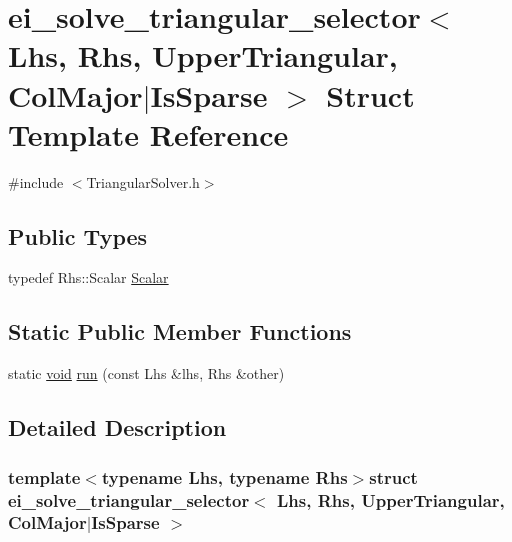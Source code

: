\hypertarget{structei__solve__triangular__selector_3_01_lhs_00_01_rhs_00_01_upper_triangular_00_01_col_major_7_is_sparse_01_4}{\section{ei\-\_\-solve\-\_\-triangular\-\_\-selector$<$ Lhs, Rhs, Upper\-Triangular, Col\-Major$|$\-Is\-Sparse $>$ Struct Template Reference}
\label{structei__solve__triangular__selector_3_01_lhs_00_01_rhs_00_01_upper_triangular_00_01_col_major_7_is_sparse_01_4}
}


{\ttfamily \#include $<$Triangular\-Solver.\-h$>$}

\subsection*{Public Types}
\begin{DoxyCompactItemize}
\item 
typedef Rhs\-::\-Scalar \hyperlink{structei__solve__triangular__selector_3_01_lhs_00_01_rhs_00_01_upper_triangular_00_01_col_major_7_is_sparse_01_4_acc02044ecd44357f220c0d93d31456c9}{Scalar}
\end{DoxyCompactItemize}
\subsection*{Static Public Member Functions}
\begin{DoxyCompactItemize}
\item 
static \hyperlink{group___u_a_v_objects_plugin_ga444cf2ff3f0ecbe028adce838d373f5c}{void} \hyperlink{structei__solve__triangular__selector_3_01_lhs_00_01_rhs_00_01_upper_triangular_00_01_col_major_7_is_sparse_01_4_afce5249c8e7e9d629942c6004b07f142}{run} (const Lhs \&lhs, Rhs \&other)
\end{DoxyCompactItemize}


\subsection{Detailed Description}
\subsubsection*{template$<$typename Lhs, typename Rhs$>$struct ei\-\_\-solve\-\_\-triangular\-\_\-selector$<$ Lhs, Rhs, Upper\-Triangular, Col\-Major$|$\-Is\-Sparse $>$}



